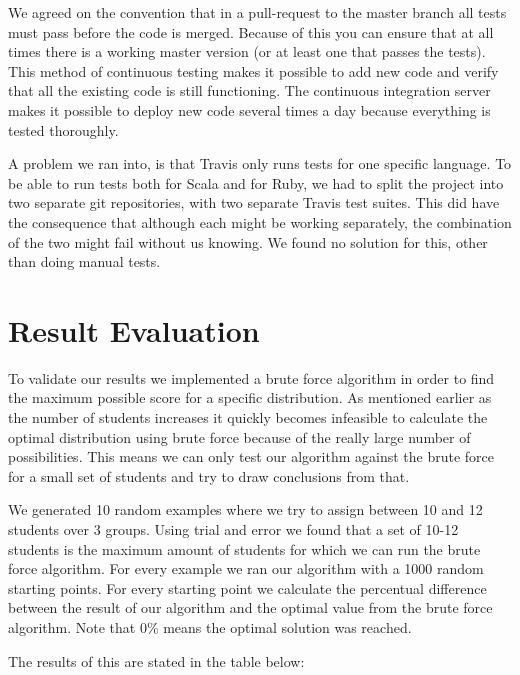 We agreed on the convention that in a pull-request to the master branch all tests must pass before the code is merged. Because of this you can ensure that at all times there is a working master version (or at least one that passes the tests). This method of continuous testing makes it possible to add new code and verify that all the existing code is still functioning. The continuous integration server makes it possible to deploy new code several times a day because everything is tested thoroughly.

A problem we ran into, is that Travis only runs tests for one specific language. To be able to run tests both for Scala and for Ruby, we had to split the project into two separate git repositories, with two separate Travis test suites. This did have the consequence that although each might be working separately, the combination of the two might fail without us knowing. We found no solution for this, other than doing manual tests.

\section{Result Evaluation}
To validate our results we implemented a brute force algorithm in order to find the maximum possible score for a specific distribution. As mentioned earlier as the number of students increases it quickly becomes infeasible to calculate the optimal distribution using brute force because of the really large number of possibilities. This means we can only test our algorithm against the brute force for a small set of students and try to draw conclusions from that. 

We generated 10 random examples where we try to assign between 10 and 12 students over 3 groups. Using trial and error we found that a set of 10-12 students is the maximum amount of students for which we can run the brute force algorithm. For every example we ran our algorithm with a 1000 random starting points. For every starting point we calculate the percentual difference between the result of our algorithm and the optimal value from the brute force algorithm. Note that 0\% means the optimal solution was reached.

The results of this are stated in the table below: 

